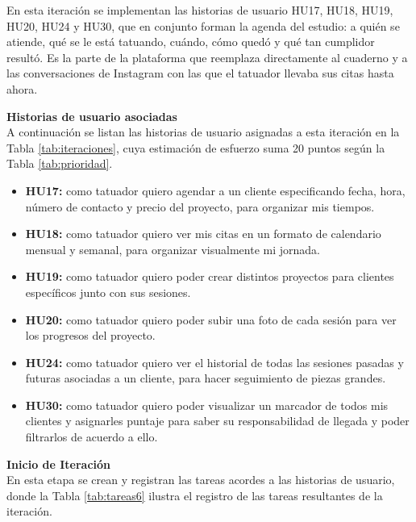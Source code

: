 \documentclass[12pt,letterpaper,oneside]{report}
\newcommand{\tituloparpegado}[1]{\par\textbf{#1}\\\indent\ignorespaces}
\begin{document}
En esta iteración se implementan las historias de usuario HU17, HU18, HU19, HU20, HU24 y HU30, que en conjunto forman la agenda del estudio: a quién se atiende, qué se le está tatuando, cuándo, cómo quedó y qué tan cumplidor resultó. Es la parte de la plataforma que reemplaza directamente al cuaderno y a las conversaciones de Instagram con las que el tatuador llevaba sus citas hasta ahora.

\vspace{0.3cm}
\tituloparpegado{Historias de usuario asociadas}
A continuación se listan las historias de usuario asignadas a esta iteración en la Tabla \ref{tab:iteraciones}, cuya estimación de esfuerzo suma 20 puntos según la Tabla \ref{tab:prioridad}.

\begin{itemize}
  \item \textbf{HU17:} como tatuador quiero agendar a un cliente especificando fecha, hora, número de contacto y precio del proyecto, para organizar mis tiempos.
  \item \textbf{HU18:} como tatuador quiero ver mis citas en un formato de calendario mensual y semanal, para organizar visualmente mi jornada.
  \item \textbf{HU19:} como tatuador quiero poder crear distintos proyectos para clientes específicos junto con sus sesiones.
  \item \textbf{HU20:} como tatuador quiero poder subir una foto de cada sesión para ver los progresos del proyecto.
  \item \textbf{HU24:} como tatuador quiero ver el historial de todas las sesiones pasadas y futuras asociadas a un cliente, para hacer seguimiento de piezas grandes.
  \item \textbf{HU30:} como tatuador quiero poder visualizar un marcador de todos mis clientes y asignarles puntaje para saber su responsabilidad de llegada y poder filtrarlos de acuerdo a ello.
\end{itemize}

\vspace{0.3cm}
\tituloparpegado{Inicio de Iteración}
En esta etapa se crean y registran las tareas acordes a las historias de usuario, donde la Tabla \ref{tab:tareas6} ilustra el registro de las tareas resultantes de la iteración.
\end{document}
